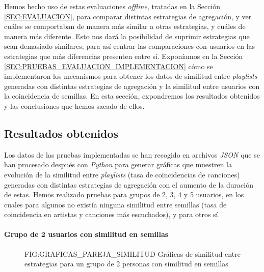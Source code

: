 Hemos hecho uso de estas evaluaciones \textit{offline}, tratadas en la Sección \ref{SEC:EVALUACION}, 
 para comparar distintas estrategias de agregación, y ver cuáles se comportaban de manera más similar a otras estrategias, y 
 cuáles de manera más diferente. Esto nos dará la posibilidad de suprimir
estrategias que sean demasiado similares, para así centrar las comparaciones con usuarios en las estrategias que más diferencias presenten entre sí.
Exponíamos en la Sección \ref{SEC:PRUEBAS_EVALUACION_IMPLEMENTACION} cómo se implementaron los mecanismos para obtener los datos de similitud entre \textit{playlists} generadas 
con distintas estrategias de agregación y la similitud entre usuarios con la coincidencia de semillas. En esta sección, expondremos los resultados obtenidos y las conclusiones 
que hemos sacado de ellos.

\subsection{Resultados obtenidos\label{SEC:RESULTADOS_OBTENIDOS}}

Los datos de las pruebas implementadas se han recogido en archivos \textit{JSON} que se han procesado después con \textit{Python} para generar gráficas que muestren la evolución 
de la similitud entre \textit{playlists} (tasa de coincidencias de canciones) generadas con distintas estrategias de agregación con el aumento de la duración de estas. Hemos realizado pruebas para grupos de 
2, 3, 4 y 5 usuarios, en los cuales para algunos no existía ninguna similitud entre semillas (tasa de coincidencia en artistas y canciones más escuchados), y para otros sí. 

\paragraph{Grupo de 2 usuarios con similitud en semillas}

\begin{figure}[Gráficas de similitud entre estrategias para un grupo de 2 personas con similitud en semillas]{FIG:GRAFICAS_PAREJA_SIMILITUD}
    {Gráficas de similitud entre estrategias para un grupo de 2 personas con similitud en semillas}
\end{figure}

